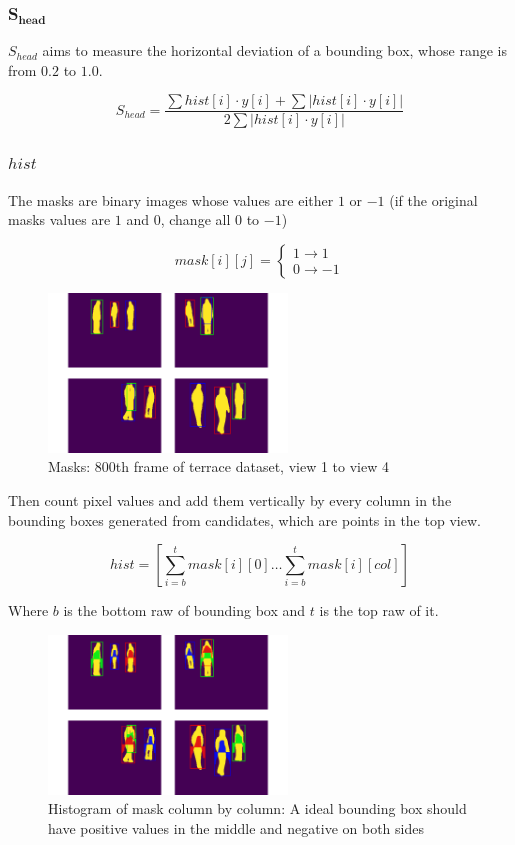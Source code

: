 \documentclass[journal]{IEEEtran}
\begin{document}
\subsubsection{S$_{\textbf{head}}$}
$S_{head}$ aims to measure the horizontal deviation of a bounding box, whose range is from $0.2$ to $1.0$.

\begin{equation*}
    S_{h e a d}=\frac{\sum h i s t[i] \cdot y[i]+\sum \left | hist[i] \cdot y[i]\right|}{2 \sum \left | hist[i] \cdot y[i]\right|} 
    \label{eq:Shead}
\end{equation*}

\subsubsection{$hist$}
The masks are binary images whose values are either $1$ or $-1$ (if the original masks values are $1$ and $0$, change all $0$ to $-1$)

$$
    mask[i][j]=\left\{\begin{array}{l}{1}\rightarrow 1 \\ {0}\rightarrow -1\end{array}\right.
$$

\begin{figure}[htb]
    \centering
    \includegraphics[width=2.5in]{fig/800th_mask.png}
    \caption{Masks: 800th frame of terrace dataset, view 1 to view 4}
    \label{fig:800th_mask}
\end{figure}

Then count pixel values and add them vertically by every column in the bounding boxes generated from candidates, which are points in the top view. 

$$
hist=\left[\sum_{i=b}^{t}{mask}[i][0] \ldots \sum_{i=b}^{t}{mask}[i][col]\right]
$$

Where $b$ is the bottom raw of bounding box and $t$ is the top raw of it.

\begin{figure}[htb]
    \centering
    \includegraphics[width=2.5in]{fig/800th_hist.png}
    \caption{Histogram of mask column by column: A ideal bounding box should have positive values in the middle and negative on both sides}
    \label{fig:800th_hist}
\end{figure}
\end{document}
